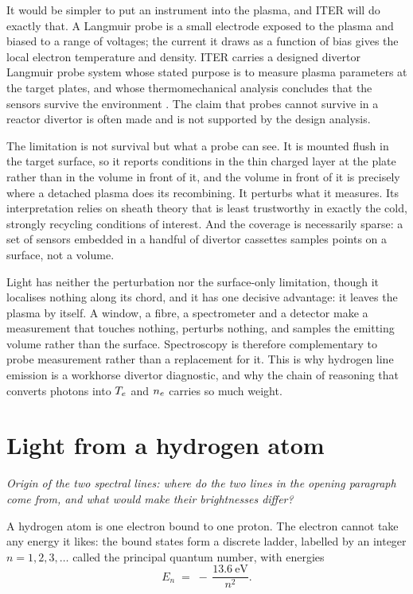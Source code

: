 It would be simpler to put an instrument into the plasma, and ITER will do
exactly that. A Langmuir probe is a small electrode exposed to the plasma and
biased to a range of voltages; the current it draws as a function of bias gives
the local electron temperature and density. ITER carries a designed divertor
Langmuir probe system whose stated purpose is to measure plasma parameters at the
target plates, and whose thermomechanical analysis concludes that the sensors
survive the environment \cite{Zhao2020}. The claim that probes cannot survive in
a reactor divertor is often made and is not supported by the design analysis.

The limitation is not survival but what a probe can see. It is mounted flush in
the target surface, so it reports conditions in the thin charged layer at the
plate rather than in the volume in front of it, and the volume in front of it
is precisely where a detached plasma does its recombining. It perturbs what it
measures. Its interpretation relies on sheath theory that is least trustworthy in
exactly the cold, strongly recycling conditions of interest. And the coverage is
necessarily sparse: a set of sensors embedded in a handful of divertor cassettes
samples points on a surface, not a volume.

Light has neither the perturbation nor the surface-only limitation, though it
localises nothing along its chord, and it has one decisive advantage: it leaves the plasma by
itself. A window, a fibre, a spectrometer and a detector make a measurement that
touches nothing, perturbs nothing, and samples the emitting volume rather than
the surface. Spectroscopy is therefore complementary to probe measurement rather
than a replacement for it. This is why hydrogen line emission is a workhorse
divertor diagnostic, and why the chain of reasoning that converts photons into
$T_e$ and $n_e$ carries so much weight.

\section{Light from a hydrogen atom}
\label{sec:hydrogen_atom}

\emph{Origin of the two spectral lines: where do the two lines in the opening paragraph come from,
and what would make their brightnesses differ?}

A hydrogen atom is one electron bound to one proton. The electron cannot take
any energy it likes: the bound states form a discrete ladder, labelled by an
integer $n = 1, 2, 3, \dots$ called the principal quantum number, with energies
\begin{equation}
  E_n \;=\; -\,\frac{\SI{13.6}{\electronvolt}}{n^{2}} .
  \label{eq:bohr_levels}
\end{equation}

